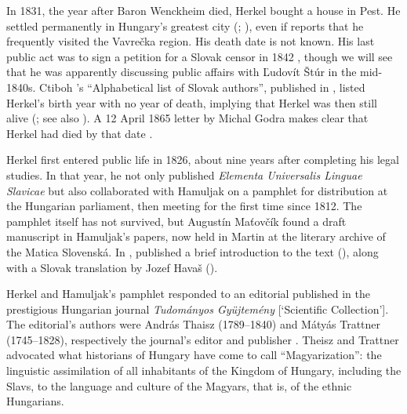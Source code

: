 In 1831, the year after Baron Wenckheim died, Herkel bought a house in Pest. He settled permanently in Hungary’s greatest city (\cite[62]{matovcik_jan_1961}; \cite[113]{kerecman_historia_2011}), even if \citet[3]{herkel_jan_2009} reports that he frequently visited the Vavrečka region. His death date is not known. His last public act was to sign a petition for a Slovak censor in 1842 \citep[13]{matovcik_prispevok_1964}, though we will see that he was apparently discussing public affairs with Ľudovít Štúr in the mid-1840s. Ctiboh \citeauthor{zoch_abecedny_1853}’s “Alphabetical list of Slovak authors”, published in \citeyear{zoch_abecedny_1853}, listed Herkel’s birth year with no year of death, implying that Herkel was then still alive (\citeyear[270]{zoch_abecedny_1853}; see also \cite[13]{matovcik_prispevok_1964}). A 12 April 1865 letter by Michal Godra makes clear that Herkel had died by that date \citep[63]{matovcik_jan_1961}.

Herkel first entered public life in 1826, about nine years after completing his legal studies. In that year, he not only published \textit{Elementa Universalis Linguae Slavicae} but also collaborated with Hamuljak on a pamphlet for distribution at the Hungarian parliament, then meeting for the first time since 1812. The pamphlet itself has not survived, but Augustín Maťovčík found a draft manuscript in Hamuljak’s papers, now held in Martin at the literary archive of the Matica Slovenská. In \citeyear{matovcik_neznama_1969}, \citeauthor{matovcik_neznama_1969} published a brief introduction to the text (\citeyear[223--226]{matovcik_neznama_1969}), along with a Slovak translation by Jozef Havaš (\citeyear[224--235]{herkel_jegyzesek_1969}).

Herkel and Hamuljak’s pamphlet responded to an \citeyear{thaisz_jelentes_1825} editorial published in the prestigious Hungarian journal \textit{Tudományos Gyüjtemény} [‘Scientific Collection’]. The editorial’s authors were András Thaisz (1789--1840) and Mátyás Trattner (1745--1828), respectively the journal’s editor and publisher \citep[118--127]{thaisz_jelentes_1825}. Theisz and Trattner advocated what historians of Hungary have come to \label{sec:1.2}call “Magyarization”: the linguistic assimilation of all inhabitants of the Kingdom of Hungary, including the Slavs, to the language and culture of the Magyars, that is, of the ethnic Hungarians.

